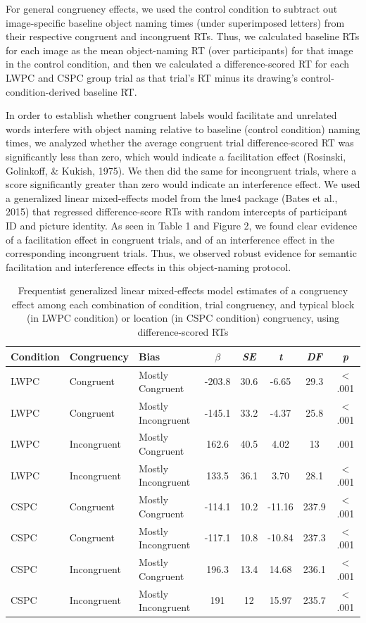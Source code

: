\documentclass[
  ,man,floatsintext]{apa6}
\begin{document}
For general congruency effects, we used the control condition to subtract out image-specific baseline object naming times (under superimposed letters) from their respective congruent and incongruent RTs. Thus, we calculated baseline RTs for each image as the mean object-naming RT (over participants) for that image in the control condition, and then we calculated a difference-scored RT for each LWPC and CSPC group trial as that trial's RT minus its drawing's control-condition-derived baseline RT.

In order to establish whether congruent labels would facilitate and unrelated words interfere with object naming relative to baseline (control condition) naming times, we analyzed whether the average congruent trial difference-scored RT was significantly less than zero, which would indicate a facilitation effect (Rosinski, Golinkoff, \& Kukish, 1975). We then did the same for incongruent trials, where a score significantly greater than zero would indicate an interference effect. We used a generalized linear mixed-effects model from the lme4 package (Bates et al., 2015) that regressed difference-score RTs with random intercepts of participant ID and picture identity. As seen in Table 1 and Figure 2, we found clear evidence of a facilitation effect in congruent trials, and of an interference effect in the corresponding incongruent trials. Thus, we observed robust evidence for semantic facilitation and interference effects in this object-naming protocol.

\begin{table}[ht]
\centering
\caption{Frequentist generalized linear mixed-effects model estimates of a congruency
effect among each combination of condition, trial congruency, and typical
block (in LWPC condition) or location (in CSPC condition) congruency, using
difference-scored RTs} 
\begin{tabular}{lll|ccccc}
  \hline
Condition & Congruency & Bias & $\beta$ & \emph{SE} & \emph{t} & \emph{DF} & \emph{p} \\ 
  \hline
LWPC & Congruent & Mostly Congruent & -203.8 & 30.6 & -6.65 & 29.3 & $<$ .001 \\ 
  LWPC & Congruent & Mostly Incongruent & -145.1 & 33.2 & -4.37 & 25.8 & $<$ .001 \\ 
  LWPC & Incongruent & Mostly Congruent & 162.6 & 40.5 & 4.02 & 13 & .001 \\ 
  LWPC & Incongruent & Mostly Incongruent & 133.5 & 36.1 & 3.70 & 28.1 & $<$ .001 \\ 
  CSPC & Congruent & Mostly Congruent & -114.1 & 10.2 & -11.16 & 237.9 & $<$ .001 \\ 
  CSPC & Congruent & Mostly Incongruent & -117.1 & 10.8 & -10.84 & 237.3 & $<$ .001 \\ 
  CSPC & Incongruent & Mostly Congruent & 196.3 & 13.4 & 14.68 & 236.1 & $<$ .001 \\ 
  CSPC & Incongruent & Mostly Incongruent & 191 & 12 & 15.97 & 235.7 & $<$ .001 \\ 
   \hline
\end{tabular}
\end{table}
\end{document}
